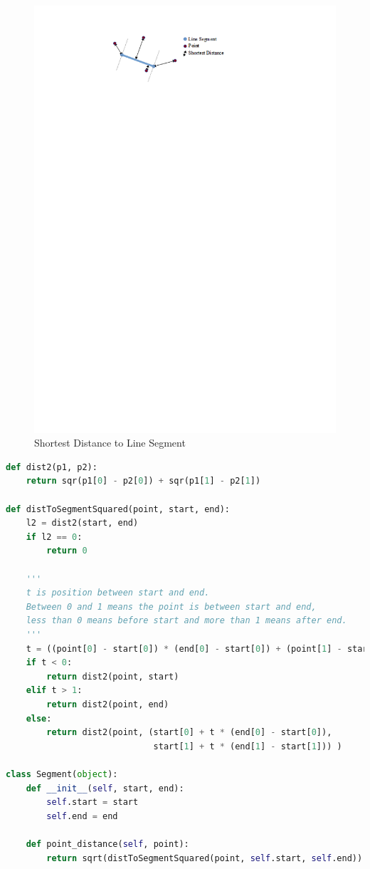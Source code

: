 \begin{figure}[ht]
 \caption{Shortest Distance to Line Segment}
 \label{fig:sprint3-linesegment}
 \includegraphics[scale=0.85]{img/sprint3linesegment.png}
\end{figure}

\begin{lstlisting}[label={lst:sprint3-dist},caption={Distance Between Point and Line Segment.},language={Python}]
def dist2(p1, p2):
	return sqr(p1[0] - p2[0]) + sqr(p1[1] - p2[1])

def distToSegmentSquared(point, start, end):
	l2 = dist2(start, end)
	if l2 == 0:
		return 0

	'''
	t is position between start and end.
	Between 0 and 1 means the point is between start and end,
	less than 0 means before start and more than 1 means after end.
	'''
	t = ((point[0] - start[0]) * (end[0] - start[0]) + (point[1] - start[1]) * (end[1] - start[1])) / l2
	if t < 0:
		return dist2(point, start)
	elif t > 1:
		return dist2(point, end)
	else:
		return dist2(point, (start[0] + t * (end[0] - start[0]),
		                     start[1] + t * (end[1] - start[1])) )

class Segment(object):
	def __init__(self, start, end):
		self.start = start
		self.end = end

	def point_distance(self, point):
		return sqrt(distToSegmentSquared(point, self.start, self.end))
\end{lstlisting}

